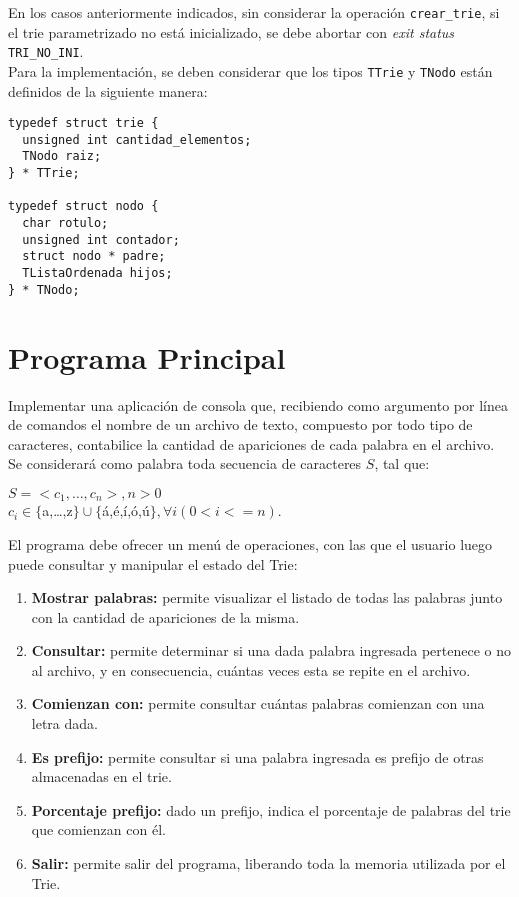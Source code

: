 \documentclass[12pt,a4paper]{article}
\begin{document}
En los casos anteriormente indicados, sin considerar la operación \texttt{crear\_trie}, si el trie parametrizado no está inicializado, se debe abortar con \emph{exit status} \texttt{TRI\_NO\_INI}. \\

Para la implementación, se deben considerar que los tipos \texttt{TTrie} y \texttt{TNodo} están definidos de la siguiente manera:

\begin{verbatim}
typedef struct trie {
  unsigned int cantidad_elementos;
  TNodo raiz;
} * TTrie;

typedef struct nodo {
  char rotulo;
  unsigned int contador;
  struct nodo * padre;
  TListaOrdenada hijos;
} * TNodo;

\end{verbatim}

\section{Programa Principal}
Implementar una aplicación de consola que, recibiendo como argumento por línea de comandos el nombre de un archivo de texto, compuesto por todo tipo de caracteres, contabilice la cantidad de apariciones de cada palabra en el archivo. Se considerará como palabra toda secuencia de caracteres $S$, tal que:
\begin{center}
$S=<c_1,\dots,c_n>, n>0$\\
$c_i \in \{$a,\dots,z$\} \cup \{$á,é,í,ó,ú$\}, \forall{i} (0<i<=n)$.
\end{center}

El programa debe ofrecer un menú de operaciones, con las que el usuario luego puede consultar y manipular el estado del Trie:
\begin{enumerate}	
	\item \textbf{Mostrar palabras:} permite visualizar el listado de todas las palabras junto con la cantidad de apariciones de la misma.
	
	\item \textbf{Consultar:} permite determinar si una dada palabra ingresada pertenece o no al archivo, y en consecuencia, cuántas veces esta se repite en el archivo.
	
	\item \textbf{Comienzan con:} permite consultar cuántas palabras comienzan con una letra dada.
	
	\item \textbf{Es prefijo:} permite consultar si una palabra ingresada es prefijo de otras almacenadas en el trie.

	\item \textbf{Porcentaje prefijo:} dado un prefijo, indica el porcentaje de palabras del trie que comienzan con él. 
	
	\item \textbf{Salir:} permite salir del programa, liberando toda la memoria utilizada por el Trie.
\end{enumerate}
	
\end{document}
